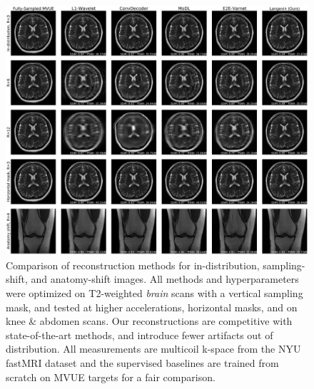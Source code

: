 \begin{figure}[t]
    \centering
    \includegraphics[width=\linewidth]{main-qualitative-comp.pdf}
    \caption{\small Comparison of reconstruction methods for
        in-distribution, sampling-shift, and anatomy-shift images.
        All methods and hyperparameters were optimized on T2-weighted
        \emph{brain} scans with a vertical sampling mask, and tested
        at higher accelerations, horizontal masks, and on knee \&
        abdomen scans.  Our reconstructions are competitive with
        state-of-the-art methods, and introduce fewer artifacts out of
        distribution.  All measurements are multicoil k-space from the
        NYU fastMRI dataset and the supervised baselines are trained
        from scratch on MVUE targets for a fair comparison.}
    \label{fig:main}
\end{figure}


